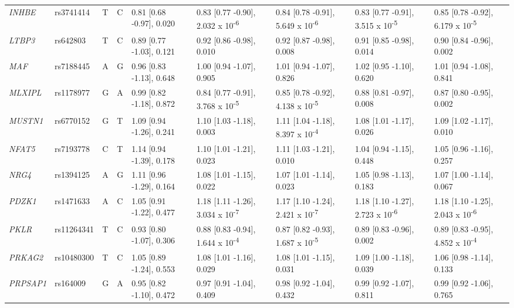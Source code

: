 \documentclass[twoside,openright]{report}
\begin{document}
\begin{landscape}
\begin{table}[!h]
{\begin{threeparttable}
\begin{tabular}[t]{lllllllll}
\em{INHBE} & rs3741414 & T & C & 0.81 [0.68 -0.97], 0.020 & 0.83 [0.77 -0.90], 2.032 x 10\textsuperscript{-6} & 0.84 [0.78 -0.91], 5.649 x 10\textsuperscript{-6} & 0.83 [0.77 -0.91], 3.515 x 10\textsuperscript{-5} & 0.85 [0.78 -0.92], 6.179 x 10\textsuperscript{-5}\\
\em{LTBP3} & rs642803 & T & C & 0.89 [0.77 -1.03], 0.121 & 0.92 [0.86 -0.98], 0.010 & 0.92 [0.87 -0.98], 0.008 & 0.91 [0.85 -0.98], 0.014 & 0.90 [0.84 -0.96], 0.002\\
\em{MAF} & rs7188445 & A & G & 0.96 [0.83 -1.13], 0.648 & 1.00 [0.94 -1.07], 0.905 & 1.01 [0.94 -1.07], 0.826 & 1.02 [0.95 -1.10], 0.620 & 1.01 [0.94 -1.08], 0.841\\
\em{MLXIPL} & rs1178977 & G & A & 0.99 [0.82 -1.18], 0.872 & 0.84 [0.77 -0.91], 3.768 x 10\textsuperscript{-5} & 0.85 [0.78 -0.92], 4.138 x 10\textsuperscript{-5} & 0.88 [0.81 -0.97], 0.008 & 0.87 [0.80 -0.95], 0.002\\
\em{MUSTN1} & rs6770152 & G & T & 1.09 [0.94 -1.26], 0.241 & 1.10 [1.03 -1.18], 0.003 & 1.11 [1.04 -1.18], 8.397 x 10\textsuperscript{-4} & 1.08 [1.01 -1.17], 0.026 & 1.09 [1.02 -1.17], 0.010\\
\em{NFAT5} & rs7193778 & C & T & 1.14 [0.94 -1.39], 0.178 & 1.10 [1.01 -1.21], 0.023 & 1.11 [1.03 -1.21], 0.010 & 1.04 [0.94 -1.15], 0.448 & 1.05 [0.96 -1.16], 0.257\\
\em{NRG4} & rs1394125 & A & G & 1.11 [0.96 -1.29], 0.164 & 1.08 [1.01 -1.15], 0.022 & 1.07 [1.01 -1.14], 0.023 & 1.05 [0.98 -1.13], 0.183 & 1.07 [1.00 -1.14], 0.067\\
\em{PDZK1} & rs1471633 & A & C & 1.05 [0.91 -1.22], 0.477 & 1.18 [1.11 -1.26], 3.034 x 10\textsuperscript{-7} & 1.17 [1.10 -1.24], 2.421 x 10\textsuperscript{-7} & 1.18 [1.10 -1.27], 2.723 x 10\textsuperscript{-6} & 1.18 [1.10 -1.25], 2.043 x 10\textsuperscript{-6}\\
\em{PKLR} & rs11264341 & T & C & 0.93 [0.80 -1.07], 0.306 & 0.88 [0.83 -0.94], 1.644 x 10\textsuperscript{-4} & 0.87 [0.82 -0.93], 1.687 x 10\textsuperscript{-5} & 0.89 [0.83 -0.96], 0.002 & 0.89 [0.83 -0.95], 4.852 x 10\textsuperscript{-4}\\
\em{PRKAG2} & rs10480300 & T & C & 1.05 [0.89 -1.24], 0.553 & 1.08 [1.01 -1.16], 0.029 & 1.08 [1.01 -1.15], 0.031 & 1.09 [1.00 -1.18], 0.039 & 1.06 [0.98 -1.14], 0.133\\
\em{PRPSAP1} & rs164009 & G & A & 0.95 [0.82 -1.10], 0.472 & 0.97 [0.91 -1.04], 0.409 & 0.98 [0.92 -1.04], 0.432 & 0.99 [0.92 -1.07], 0.811 & 0.99 [0.92 -1.06], 0.765\\

\end{tabular}
\end{threeparttable}}
\end{table}
\end{landscape}
\end{document}
